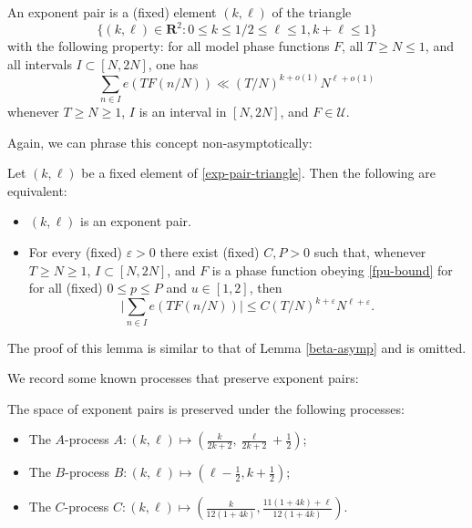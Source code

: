 \documentclass[a4paper, 10pt]{amsart}
\newcommand{\eps}{\varepsilon}
\newcommand{\R}{\mathbf{R}}
\begin{document}
\begin{definition}\label{exp-pair-def}  An exponent pair is a (fixed) element $(k,\ell)$ of the triangle
    \begin{equation}\label{exp-pair-triangle}
        \{ (k,\ell) \in \R^2: 0 \leq k \leq 1/2 \leq \ell \leq 1, k+\ell \leq 1 \}
    \end{equation}
    with the following property: for all model phase functions $F$, all $T \geq N \leq 1$, and all intervals $I \subset [N,2N]$, one has
    \begin{equation*}\label{ntf}
     \sum_{n \in I} e(T F(n/N)) \ll (T/N)^{k+o(1)} N^{\ell+o(1)}
    \end{equation*}
    whenever $T \geq N \geq 1$, $I$ is an interval in $[N,2N]$, and $F \in {\mathcal U}$.
\end{definition}

Again, we can phrase this concept non-asymptotically:

\begin{lemma}  Let $(k,\ell)$ be a fixed element of \eqref{exp-pair-triangle}.  Then the following are equivalent:
    \begin{itemize}
    \item[(i)] $(k,\ell)$ is an exponent pair.
    \item[(ii)] For every (fixed) $\eps>0$ there exist (fixed) $C, P > 0$ such that, whenever $T \geq N \geq 1$, $I \subset [N,2N]$, and $F$ is a phase function obeying \eqref{fpu-bound} for for all (fixed) $0 \leq p \leq P$ and $u \in [1,2]$, then
    \begin{equation*}\label{tfn}
        \bigg|\sum_{n \in I} e(T F(n/N))\bigg| \leq C (T/N)^{k+\eps} N^{\ell+\eps}.
    \end{equation*}
   \end{itemize}
\end{lemma}

The proof of this lemma is similar to that of Lemma \ref{beta-asymp} and is omitted.

We record some known processes that preserve exponent pairs:

\begin{lemma}\label{exp-process}  The space of exponent pairs is preserved under the following processes:
    \begin{itemize}
    \item[(A)] The $A$-process $A: (k,\ell) \mapsto (\frac{k}{2k+2}, \frac{\ell}{2k+2} + \frac{1}{2})$;
    \item[(B)] The $B$-process $B: (k,\ell) \mapsto (\ell-\frac{1}{2}, k+\frac{1}{2})$;
    \item[(C)] The $C$-process $C: (k,\ell) \mapsto (\frac{k}{12(1+4k)}, \frac{11(1+4k)+\ell}{12(1+4k)})$.
    \end{itemize}
\end{lemma}
\end{document}
